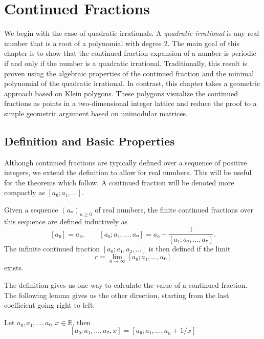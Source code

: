 \chapter{Continued Fractions}
\label{ch:quadratic}

We begin with the case of quadratic irrationals.
A \emph{quadratic irrational} is any real number
that is a root of a polynomial with degree $2$.
The main goal of this chapter is to show that the continued fraction expansion
of a number is periodic if and only if the number is a quadratic irrational.
Traditionally, this result is proven using the algebraic properties of the
continued fraction and the minimal polynomial of the quadratic irrational.
In contrast, this chapter takes a geometric approach based on Klein polygons.
These polygons visualize the continued fractions as points in a two-dimensional
integer lattice and reduce the proof to a simple geometric argument based on unimodular matrices.

\section{Definition and Basic Properties}
\label{sec:cf-def}

Although continued fractions are typically defined over a sequence of
positive integers, we extend the definition to allow for real numbers.
This will be useful for the theorems which follow.
A continued fraction will be denoted more compactly as $[a₀; a₁, …]$.

\begin{definition}
  \label{def:cont-frac}
  Given a sequence $(aₙ)_{n≥0}$ of real numbers, the finite continued
  fractions over this sequence are defined inductively as
  \[
    [a₀] = a₀, \qquad
    [a₀; a₁, …, aₙ] = a₀ + \frac{1}{[a₁; a₂, …, aₙ]}.
  \]
  The infinite continued fraction $[a₀; a₁, a₂, …]$ is then defined if the limit
  \[
    r = \lim_{n → ∞} [a₀; a₁, …, aₙ]
  \]
  exists.
\end{definition}

The definition gives us one way to calculate the value of a continued fraction.
The following lemma gives us the other direction,
starting from the last coefficient going right to left:

\begin{lemma}
  \label{lem:cf-nesting}
  Let $a₀, a₁, …, aₙ, x ∈ ℝ$, then
  \[
    [a₀; a₁, …, aₙ, x] = [a₀; a₁, …, a_n + 1/x]
  \]
\end{lemma}

